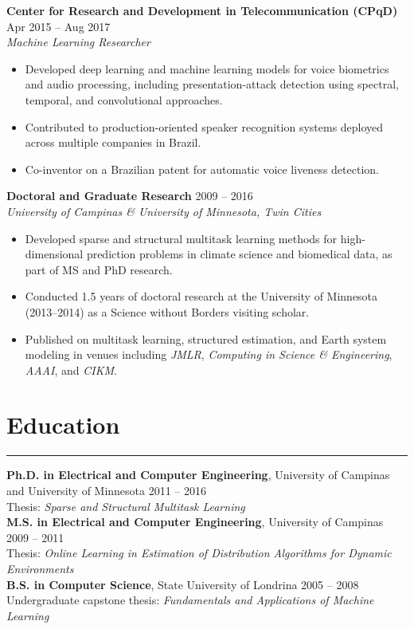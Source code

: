 \documentclass[10pt,letterpaper]{article}
\newcommand{\sectionrule}{\vspace{-0.1em}\hrule\vspace{0.25em}}
\newcommand{\entry}[4]{%
	\textbf{#1} \hfill #2\\
	\textit{#3}\nopagebreak\vspace{-0.55em}
	#4\vspace{0.15em}
}
\begin{document}
	\entry{Center for Research and Development in Telecommunication (CPqD)}{Apr 2015 -- Aug 2017}{Machine Learning Researcher}{
		\begin{itemize}
			\item Developed deep learning and machine learning models for voice biometrics and audio processing, including presentation-attack detection using spectral, temporal, and convolutional approaches.
			\item Contributed to production-oriented speaker recognition systems deployed across multiple companies in Brazil.
			\item Co-inventor on a Brazilian patent for automatic voice liveness detection.
	\end{itemize}}
	
	\entry{Doctoral and Graduate Research}{2009 -- 2016}{University of Campinas \& University of Minnesota, Twin Cities}{
		\begin{itemize}
			\item Developed sparse and structural multitask learning methods for high-dimensional prediction problems in climate science and biomedical data, as part of MS and PhD research.
			\item Conducted 1.5 years of doctoral research at the University of Minnesota (2013--2014) as a Science without Borders visiting scholar.
			\item Published on multitask learning, structured estimation, and Earth system modeling in venues including \textit{JMLR}, \textit{Computing in Science \& Engineering}, \textit{AAAI}, and \textit{CIKM}.
	\end{itemize}}
	
	\section*{Education}
	\sectionrule
	
	\textbf{Ph.D. in Electrical and Computer Engineering}, University of Campinas and University of Minnesota \hfill 2011 -- 2016\\
	Thesis: \textit{Sparse and Structural Multitask Learning}\\[0.2em]
	\textbf{M.S. in Electrical and Computer Engineering}, University of Campinas \hfill 2009 -- 2011\\
	Thesis: \textit{Online Learning in Estimation of Distribution Algorithms for Dynamic Environments}\\[0.2em]
	\textbf{B.S. in Computer Science}, State University of Londrina \hfill 2005 -- 2008\\
	Undergraduate capstone thesis: \textit{Fundamentals and Applications of Machine Learning}
	
\end{document}
